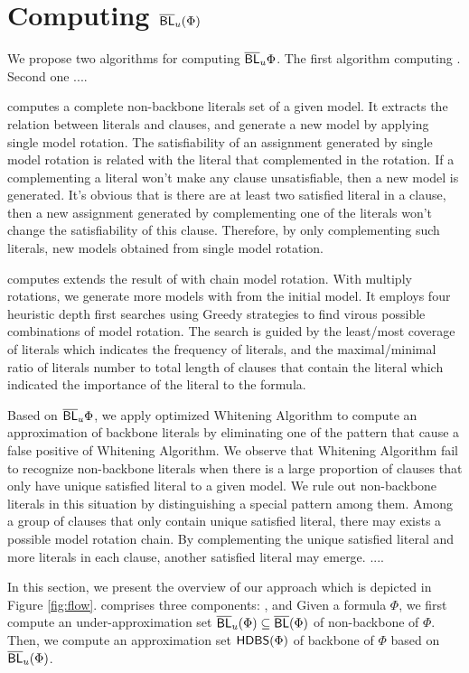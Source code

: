 \section{Computing $\overline{\textsf{BL}}_u(\Phi)$}


We propose two algorithms for computing $\overline{\textsf{BL}}_u{\Phi}$. The first algorithm computing \MBNB.
Second one \HBNB....

\MBNB computes a complete non-backbone literals set of a given model.
It extracts the relation between literals and clauses, and generate a new model by applying single model rotation.
The satisfiability of an assignment generated by single model rotation is related with the literal that complemented in the rotation. If a complementing a literal won't make any clause unsatisfiable, then a new model is generated. It's obvious that is there are at least two satisfied literal in a clause, then a new assignment generated by complementing one of the literals won't change the satisfiability of this clause. Therefore, by only complementing such literals, new models obtained from single model rotation.

\HBNB computes extends the result of \MBNB with chain model rotation. With multiply rotations, we generate more models with from the initial model. It employs four heuristic depth first searches using Greedy strategies to find virous possible combinations of model rotation. The search is guided by the least/most coverage of literals which indicates the frequency of literals, and the maximal/minimal ratio of literals number to total length of clauses that contain the literal which indicated the importance of the literal to the formula.

\medskip
Based on $\overline{\textsf{BL}}_u{\Phi}$, we apply optimized Whitening Algorithm to compute an approximation of backbone literals by eliminating one of the pattern that cause a false positive of Whitening Algorithm.
We observe that Whitening Algorithm fail to recognize non-backbone literals when there is a large proportion of clauses that only have unique satisfied literal to a given model. We rule out non-backbone literals in this situation by distinguishing a special pattern among them. Among a group of clauses that only contain unique satisfied literal, there may exists a possible model rotation chain. By complementing the unique satisfied literal and more literals in each clause, another satisfied literal may emerge.
....


In this section, we present the overview of our approach \tool which is depicted in Figure
\ref{fig:flow}. \tool comprises three components: \NB, \HBL and
Given a formula
$\Phi$, we first compute an under-approximation set $\overline{\textsf{BL}}_u(\Phi)\subseteq \overline{\textsf{BL}}(\Phi)$ of non-backbone of $\Phi$.
Then, we compute an approximation set $\textsf{HDBS}(\Phi)$ of backbone of $\Phi$ based on $\overline{\textsf{BL}}_u(\Phi)$.



